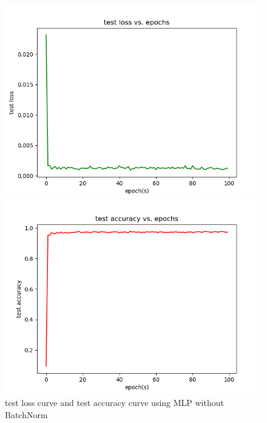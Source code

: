 \documentclass{elegantbook}
\begin{document}
\begin{figure}[!h]
	\centering
	\begin{minipage}[t]{0.48\textwidth}
		\centering
		\includegraphics[width=\textwidth]{../results/testloss12}
	\end{minipage}
	\begin{minipage}[t]{0.48\textwidth}
		\centering
		\includegraphics[width=\textwidth]{../results/testacc12}
	\end{minipage}
	\caption{\label{testres12}test loss curve and test accuracy curve using MLP without BatchNorm}
\end{figure}
\end{document}
